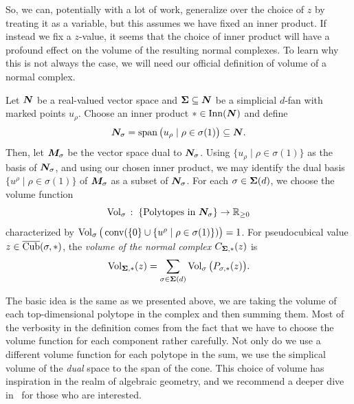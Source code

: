 \documentclass[12pt,oneside]{../../sfsuthesis}
\begin{document}
So, we can, potentially with a lot of work, generalize over the choice of \( z \) by treating it as a variable, but this assumes we have fixed an inner product.
If instead we fix a \( z \)-value, it seems that the choice of inner product will have a profound effect on the volume of the resulting normal complexes.
To learn why this is not always the case, we will need our official definition of volume of a normal complex.
\begin{definition}\th\label{def:volNormalComplex}
    Let \( \bm{N} \) be a real-valued vector space and \( {\bm{\Sigma}} \subseteq \bm{N} \) be a simplicial \( d \)-fan with marked points \( u_\rho \).
    Choose an inner product \( \ast \in \operatorname{Inn}(\bm{N}) \) and define
    \[
        \bm{N}_\sigma = \operatorname{span}\big(u_\rho \; | \; \rho \in \sigma(1)\big) \subseteq \bm{N}.
    \]
    Then, let \( \bm{M}_\sigma \) be the vector space dual to \( \bm{N}_\sigma \).
    Using \( \{ u_\rho \; | \; \rho \in \sigma(1) \} \) as the basis of \( \bm{N}_\sigma \), and using our chosen inner product, we may identify the dual basis \( \{ u^\rho \; | \; \rho \in \sigma(1) \} \) of \( \bm{M}_\sigma \) as a subset of \( \bm{N}_\sigma \).
    For each \( \sigma \in {\bm{\Sigma}}(d) \), we choose the volume function
    \[
        \operatorname{Vol}_\sigma \,:\; \{\text{Polytopes in \( \bm{N}_\sigma \)} \}  \to \mathbb{R}_{\geq 0}
    \]
    characterized by \( \operatorname{Vol}_\sigma\big( \operatorname{conv}( \{0\} \cup \{u^\rho \; | \; \rho \in \sigma(1)\})\big) = 1 \).
    For pseudocubical value \( z \in \operatorname{\overline{Cub}}(\sigma, \ast) \), the \emph{volume of the normal complex} \(  C_{{\bm{\Sigma}}, \ast}(z) \) is
    \[
        \operatorname{Vol}_{{\bm{\Sigma}}, \ast}(z) = \sum_{\sigma \in {\bm{\Sigma}}(d)} \operatorname{Vol}_\sigma\big(P_{\sigma, \ast}(z)\big).
    \]
\end{definition}

The basic idea is the same as we presented above, we are taking the volume of each top-dimensional polytope in the complex and then summing them.
Most of the verbosity in the definition comes from the fact that we have to choose the volume function for each component rather carefully.
Not only do we use a different volume function for each polytope in the sum, we use the simplical volume of the \textit{dual} space to the span of the cone.
This choice of volume has inspiration in the realm of algebraic geometry, and we recommend a deeper dive in~\cite{nathansonTropicalFansNormal2023} for those who are interested.
\end{document}
